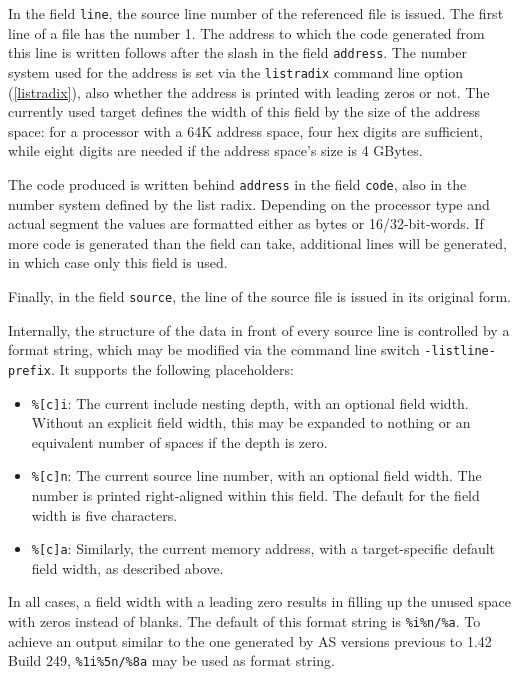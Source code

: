 \documentclass[12pt,twoside]{report}
\newcommand{\tty}[1]{{\tt #1}}
\newcommand{\asname}{{AS}}
\begin{document}
In the field \tty{line}, the source line number of the referenced file is
issued. The first line of a file has the number 1.  The address to
which the code generated from this line is written follows after the
slash in the field \tty{address}.  The number system used for the address
is set via the {\tt listradix} command line option (\ref{listradix}), also
whether the address is printed with leading zeros or not.  The currently
used target defines the width of this field by the size of the address
space: for a processor with a 64K address space, four hex digits are
sufficient, while eight digits are needed if the address space's size
is 4 GBytes.

The code produced is written behind \tty{address} in the field \tty{code},
also in the number system defined by the list radix.  Depending on the processor type and actual
segment the values are formatted either as bytes or 16/32-bit-words.
If more code is generated than the field can take, additional lines
will be  generated, in which case only this field is used.

Finally, in the field \tty{source}, the line of the source file is issued in
its original form.

Internally, the structure of the data in front of every source line
is controlled by a format string, which may be modified via the
command line switch {\tt -listline-prefix}.  It supports the
following placeholders:
\begin{itemize}
\item{{\tt \%[c]i}: The current include nesting depth, with an optional
      field width.  Without an explicit field width, this may be
      expanded to nothing or an equivalent number of spaces if
      the depth is zero.}
\item{{\tt \%[c]n}: The current source line number, with an optional
      field width.  The number is printed right-aligned within
      this field. The default for the field width is five characters.}
\item{{\tt \%[c]a}: Similarly, the current memory address, with a
      target-specific default field width, as described above.}
\end{itemize}
In all cases, a field width with a leading zero results in filling up
the unused space with zeros instead of blanks.  The default of this
format string is \verb!%i%n/%a!.  To achieve an output similar to the
one generated by \asname{} versions previous to 1.42 Build 249,
\verb!%1i%5n/%8a! may be used as format string.
\end{document}
